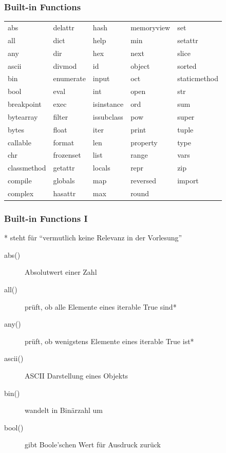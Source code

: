 \documentclass[ngerman]{beamer}
\begin{document}
\begin{frame}
\frametitle{Built-in Functions}

\begin{tabular}{lllll}
abs	&	delattr	&	hash	&	memoryview	&	set	\\
all	&	dict	&	help	&	min	&	setattr	\\
any	&	dir	&	hex	&	next	&	slice	\\
ascii	&	divmod	&	id	&	object	&	sorted	\\
bin	&	enumerate	&	input	&	oct	&	staticmethod	\\
bool	&	eval	&	int	&	open	&	str	\\
breakpoint	&	exec	&	isinstance	&	ord	&	sum	\\
bytearray	&	filter	&	issubclass	&	pow	&	super	\\
bytes	&	float	&	iter	&	print	&	tuple	\\
callable	&	format	&	len	&	property	&	type	\\
chr	&	frozenset	&	list	&	range	&	vars	\\
classmethod	&	getattr	&	locals	&	repr	&	zip	\\
compile	&	globals	&	map	&	reversed	&	\textunderscore \textunderscore import \textunderscore \textunderscore	\\
complex	&	hasattr	&	max	&	round	&		\\
\end{tabular}
\end{frame}

\begin{frame}
\frametitle{Built-in Functions I}

* steht für \enquote{vermutlich keine Relevanz in der Vorlesung}

\begin{description}
\item[abs()] Absolutwert einer Zahl
\item[all()] prüft, ob alle Elemente eines iterable True sind*
\item[any()] prüft, ob wenigstens Elemente eines iterable True ist*
\item[ascii()] ASCII Darstellung eines Objekts
\item[bin()] wandelt in Binärzahl um
\item[bool()] gibt Boole'schen Wert für Ausdruck zurück 
\end{description}
\end{frame}
\end{document}
